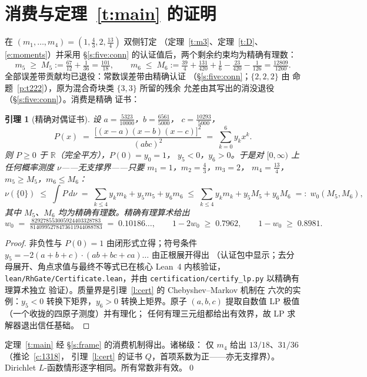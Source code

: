 \documentclass[11pt]{article}
\numberwithin{equation}{section}
\newtheorem{lemma}[theorem]{引理}
\theoremstyle{definition}
\theoremstyle{remark}
\begin{document}
\section{消费与定理~\ref{t:main} 的证明}\label{s:lp}

在 $(m_1,\dots,m_4)=(1,\tfrac43,2,\tfrac{13}4)$ 双侧钉定
（定理~\ref{t:m3}、定理~\ref{t:D}、\eqref{e:moments}）并采用
\S\ref{s:five:conn} 的认证值后，两个剩余约束均为精确有理数：
\[
m_5\;\ge\;M_5:=\tfrac{67}{12}+\tfrac1{36}=\tfrac{101}{18},
\qquad
m_6\;\le\;M_6:=\tfrac{39}4+\tfrac{131}{420}
+\tfrac16-\tfrac{23}{420}-\tfrac1{126}
=\tfrac{12809}{1260}.
\]
全部误差带贡献均已退役：常数误差带由精确认证
（\S\ref{s:five:conn}；$\{2,2,2\}$ 由
命题~\ref{p:t222}），原为混合奇块类 $\{3,3\}$ 所留的残余
允差由其写出的消没退役（\S\ref{s:five:conn}）。消费是精确
证书：

\begin{lemma}[精确对偶证书]\label{l:dual}
设 $a=\tfrac{5323}{10000}$，$b=\tfrac{6561}{5000}$，
$c=\tfrac{10293}{5000}$，
\[
P(x)\;=\;\frac{\bigl[(x-a)(x-b)(x-c)\bigr]^{2}}{(abc)^{2}}
\;=\;\sum_{k=0}^{6}y_kx^{k}.
\]
则 $P\ge0$ 于 $\mathbb R$（完全平方），$P(0)=y_0=1$，
$y_5<0$，$y_6>0$。于是对 $[0,\infty)$ 上\emph{任何}概率测度
$\nu$——无支撑界——只要 $m_1=1$，$m_2=\tfrac43$，$m_3=2$，
$m_4=\tfrac{13}4$，$m_5\ge M_5$，$m_6\le M_6$：
\[
\nu(\{0\})\;\le\;\int P\,d\nu
\;=\;\sum_{k\le4}y_km_k+y_5m_5+y_6m_6
\;\le\;\sum_{k\le4}y_km_k+y_5M_5+y_6M_6\;=:\;w_0(M_5,M_6),
\]
其中 $M_5$、$M_6$ 均为精确有理数。精确有理算术给出
\[
w_0\;=\;
\tfrac{829278553005924403328783}{8140995278473611944088783}
\;=\;0.10186\ldots,
\qquad
1-2w_0\;\ge\;0.7962,\qquad 1-w_0\;\ge\;0.8981 .
\]
\end{lemma}

\begin{proof}
非负性与 $P(0)=1$ 由闭形式立得；符号条件
$y_5=-2(a{+}b{+}c)\cdot(ab{+}bc{+}ca)\ldots$ 由正根展开得出
（认证包中显示；去分母展开、角点求值与最终不等式已在核心
Lean~4 内核验证，\texttt{lean/RhGate/Certificate.lean}，并由
\texttt{certification/certify\_lp.py} 以精确有理算术独立
验证）。质量界是引理~\ref{l:cert} 的 Chebyshev--Markov 机制在
六次的实例：$y_5<0$ 转换下矩界，$y_6>0$ 转换上矩界。原子
$(a,b,c)$ 提取自数值 LP 极值（一个收拢的四原子测度）并有理化；
任何有理三元组都给出有效界，故 LP 求解器退出信任基础。
\end{proof}

定理~\ref{t:main} 经 \S\ref{s:frame} 的消费机制得出。诸梯级：
仅 $m_4$ 给出 $13/18$、$31/36$（推论~\ref{c:1318}，
引理~\ref{l:cert} 的证书 $Q$，首项系数为正——亦无支撑界）。
Dirichlet $L$-函数情形逐字相同。所有常数非有效。\qed
\end{document}
